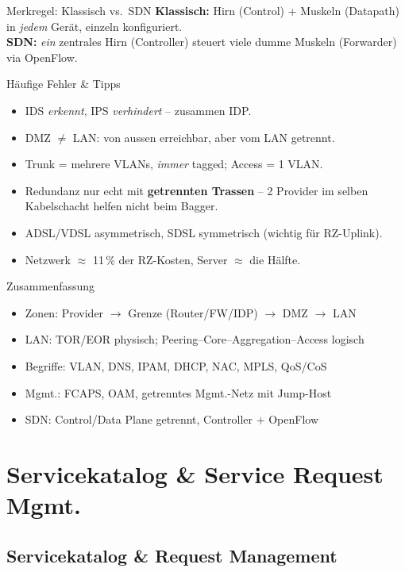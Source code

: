 \documentclass[a4paper, fontsize=7pt]{scrartcl}
\begin{document}
\begin{subbox}{Merkregel: Klassisch vs.\ SDN}
\textbf{Klassisch:} Hirn (Control) + Muskeln (Datapath) in \emph{jedem}
Gerät, einzeln konfiguriert.\\
\textbf{SDN:} \emph{ein} zentrales Hirn (Controller) steuert viele dumme
Muskeln (Forwarder) via OpenFlow.
\end{subbox}

\begin{subbox}{Häufige Fehler \& Tipps}
\begin{itemize}
    \item IDS \emph{erkennt}, IPS \emph{verhindert} -- zusammen IDP.
    \item DMZ $\neq$ LAN: von aussen erreichbar, aber vom LAN getrennt.
    \item Trunk = mehrere VLANs, \emph{immer} tagged; Access = 1 VLAN.
    \item Redundanz nur echt mit \textbf{getrennten Trassen} -- 2 Provider
          im selben Kabelschacht helfen nicht beim Bagger.
    \item ADSL/VDSL asymmetrisch, SDSL symmetrisch (wichtig für RZ-Uplink).
    \item Netzwerk $\approx$ 11\,\% der RZ-Kosten, Server $\approx$ die
          Hälfte.
\end{itemize}
\end{subbox}

\begin{subbox}{Zusammenfassung}
\begin{itemize}
    \item Zonen: Provider $\to$ Grenze (Router/FW/IDP) $\to$ DMZ $\to$ LAN
    \item LAN: TOR/EOR physisch; Peering--Core--Aggregation--Access logisch
    \item Begriffe: VLAN, DNS, IPAM, DHCP, NAC, MPLS, QoS/CoS
    \item Mgmt.: FCAPS, OAM, getrenntes Mgmt.-Netz mit Jump-Host
    \item SDN: Control/Data Plane getrennt, Controller + OpenFlow
\end{itemize}
\end{subbox}

\section{Servicekatalog \& Service Request Mgmt.}

\subsection{Servicekatalog \& Request Management}
\end{document}

